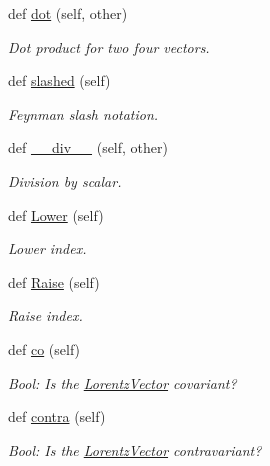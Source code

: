 \begin{DoxyCompactItemize}
def \hyperlink{class_py_spinor_1_1_lorentz_vector_1_1_lorentz_vector_ad011c74a579e139893eb6705b9b70af1}{dot} (self, other)
\begin{DoxyCompactList}\small\item\em Dot product for two four vectors. \end{DoxyCompactList}\item 
def \hyperlink{class_py_spinor_1_1_lorentz_vector_1_1_lorentz_vector_a9ce48fd10a5b006f9a42423d689c7e38}{slashed} (self)
\begin{DoxyCompactList}\small\item\em Feynman slash notation. \end{DoxyCompactList}\item 
def \hyperlink{class_py_spinor_1_1_lorentz_vector_1_1_lorentz_vector_af7c7e87a6ca9cd879f5f17edd1e474af}{\+\_\+\+\_\+div\+\_\+\+\_\+} (self, other)
\begin{DoxyCompactList}\small\item\em Division by scalar. \end{DoxyCompactList}\item 
def \hyperlink{class_py_spinor_1_1_lorentz_vector_1_1_lorentz_vector_a1a40b84d71110ea6280f0d53a371e8ff}{Lower} (self)
\begin{DoxyCompactList}\small\item\em Lower index. \end{DoxyCompactList}\item 
def \hyperlink{class_py_spinor_1_1_lorentz_vector_1_1_lorentz_vector_a2de4017ffc816aeed0ebf7e8dd189464}{Raise} (self)
\begin{DoxyCompactList}\small\item\em Raise index. \end{DoxyCompactList}\item 
def \hyperlink{class_py_spinor_1_1_lorentz_vector_1_1_lorentz_vector_ab8854208c107ed5ef4fec5d3036e0220}{co} (self)
\begin{DoxyCompactList}\small\item\em Bool\+: Is the \hyperlink{class_py_spinor_1_1_lorentz_vector_1_1_lorentz_vector}{Lorentz\+Vector} covariant? \end{DoxyCompactList}\item 
def \hyperlink{class_py_spinor_1_1_lorentz_vector_1_1_lorentz_vector_ab2fcc827cfd71331e8f62e9c6bf95197}{contra} (self)
\begin{DoxyCompactList}\small\item\em Bool\+: Is the \hyperlink{class_py_spinor_1_1_lorentz_vector_1_1_lorentz_vector}{Lorentz\+Vector} contravariant? \end{DoxyCompactList}\item 

\end{DoxyCompactItemize}
